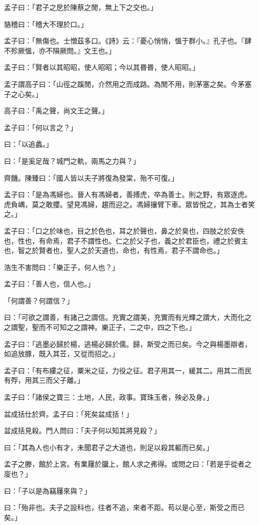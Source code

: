 \begin{pinyinscope}
孟子曰：「君子之戹於陳蔡之閒，無上下之交也。」

貉稽曰：「稽大不理於口。」

孟子曰：「無傷也。士憎茲多口。《詩》云：『憂心悄悄，慍于群小。』孔子也。『肆不殄厥慍，亦不隕厥問。』文王也。」

孟子曰：「賢者以其昭昭，使人昭昭；今以其昬昬，使人昭昭。」

孟子謂高子曰：「山徑之蹊閒，介然用之而成路。為閒不用，則茅塞之矣。今茅塞子之心矣。」

高子曰：「禹之聲，尚文王之聲。」

孟子曰：「何以言之？」

曰：「以追蠡。」

曰：「是奚足哉？城門之軌，兩馬之力與？」

齊饑。陳臻曰：「國人皆以夫子將復為發棠，殆不可復。」

孟子曰：「是為馮婦也。晉人有馮婦者，善搏虎，卒為善士。則之野，有眾逐虎。虎負嵎，莫之敢攖。望見馮婦，趨而迎之。馮婦攘臂下車。眾皆悅之，其為士者笑之。」

孟子曰：「口之於味也，目之於色也，耳之於聲也，鼻之於臭也，四肢之於安佚也，性也，有命焉，君子不謂性也。仁之於父子也，義之於君臣也，禮之於賓主也，智之於賢者也，聖人之於天道也，命也，有性焉，君子不謂命也。」

浩生不害問曰：「樂正子，何人也？」

孟子曰：「善人也，信人也。」

「何謂善？何謂信？」

曰：「可欲之謂善，有諸己之謂信。充實之謂美，充實而有光輝之謂大，大而化之之謂聖，聖而不可知之之謂神。樂正子，二之中，四之下也。」

孟子曰：「逃墨必歸於楊，逃楊必歸於儒。歸，斯受之而已矣。今之與楊墨辯者，如追放豚，既入其苙，又從而招之。」

孟子曰：「有布縷之征，粟米之征，力役之征。君子用其一，緩其二。用其二而民有殍，用其三而父子離。」

孟子曰：「諸侯之寶三：土地，人民，政事。寶珠玉者，殃必及身。」

盆成括仕於齊。孟子曰：「死矣盆成括！」

盆成括見殺。門人問曰：「夫子何以知其將見殺？」

曰：「其為人也小有才，未聞君子之大道也，則足以殺其軀而已矣。」

孟子之滕，館於上宮。有業屨於牖上，館人求之弗得。或問之曰：「若是乎從者之廀也？」

曰：「子以是為竊屨來與？」

曰：「殆非也。夫子之設科也，往者不追，來者不距。苟以是心至，斯受之而已矣。」


\end{pinyinscope}
